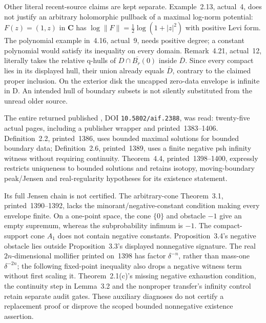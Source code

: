 Other literal recent-source claims are kept separate. Example~2.13,
actual~4, does not justify an arbitrary holomorphic pullback of a
maximal log-norm potential: \(F(z)=(1,z)\) in \(\mathbf C\) has
\(\log\|F\|=\tfrac12\log(1+|z|^2)\) with positive Levi form.
The polynomial example in~4.16, actual~9, needs positive degree;
a constant polynomial would satisfy its inequality on every domain.
Remark~4.21, actual~12, literally takes the relative q-hulls of
\(\overline{D\cap B_r(0)}\) inside \(\overline D\). Since every compact
lies in its displayed hull, their union already equals \(\overline D\),
contrary to the claimed proper inclusion. On the exterior disk the
uncapped zero-data envelope is infinite in D. An intended hull of
boundary subsets is not silently substituted from the unread older source.

The entire returned published \cite{NguyenHung08UnboundedPublished},
DOI \nolinkurl{10.5802/aif.2388}, was read: twenty-five actual pages,
including a publisher wrapper and printed~1383--1406.
Definition~2.2, printed~1386, uses bounded maximal solutions for
bounded boundary data; Definition~2.6, printed~1389, uses a finite
negative psh infinity witness without requiring continuity.
Theorem~4.4, printed~1398--1400, expressly restricts uniqueness
to bounded solutions and retains isotopy, moving-boundary peak/Jensen
and real-regularity hypotheses for its existence statement.

Its full Jensen chain is not certified. The arbitrary-cone
Theorem~3.1, printed~1390--1392, lacks the minorant/negative-constant
condition making every envelope finite. On a one-point space,
the cone \(\{0\}\) and obstacle \(-1\) give an empty supremum,
whereas the subprobability infimum is \(-1\). The compact-support
cone \(A_1\) does not contain negative constants. Proposition~3.4's
negative obstacle lies outside Proposition~3.3's displayed nonnegative
signature. The real \(2n\)-dimensional mollifier printed on~1398
has factor \(\delta^{-n}\), rather than mass-one \(\delta^{-2n}\);
the following fixed-point inequality also drops a negative witness
term without first scaling it. Theorem~2.1(c)'s missing negative
exhaustion condition, the continuity step in Lemma~3.2 and the
nonproper transfer's infinity control retain separate audit gates.
These auxiliary diagnoses do not certify a replacement proof or
disprove the scoped bounded nonnegative existence assertion.

